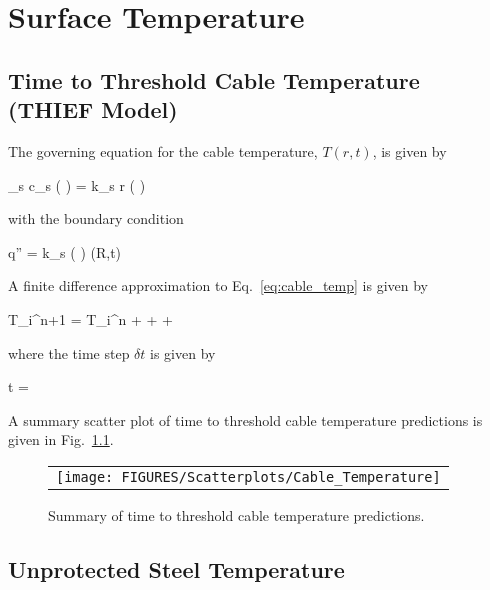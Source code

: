 \chapter{Surface Temperature}

\section{Time to Threshold Cable Temperature (THIEF Model)}

The governing equation for the cable temperature, $T(r,t)$, is given by

\be
\rho_s c_s \left(  \right) =   k_s r \left(  \right)
\label{eq:cable_temp}
\ee

\noindent with the boundary condition

\be
\dot q'' = k_s \left(  \right) (R,t)
\ee

\noindent A finite difference approximation to Eq.~\ref{eq:cable_temp} is given by

\be
T_i^{n+1} = T_i^n +  +  + 
\ee

\noindent where the time step $\delta t$ is given by

\be
\delta t = 
\ee

\clearpage

A summary scatter plot of time to threshold cable temperature predictions is given in Fig.~\ref{time_to_threshold_cable_temperature_summary}.

\begin{figure}[ht]
\begin{center}
\begin{tabular}{l}
\texttt{[image: FIGURES/Scatterplots/Cable\_Temperature]}
\end{tabular}
\end{center}
\caption[Summary of time to threshold cable temperature predictions.]
{Summary of time to threshold cable temperature predictions.}
\label{time_to_threshold_cable_temperature_summary}
\end{figure}


\clearpage


\section{Unprotected Steel Temperature}

